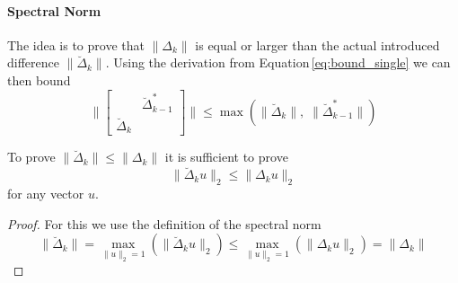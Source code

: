 \documentclass[numbers=noenddot,doctype=mastersthesis,BCOR=15mm,biblatex]{ldvbook}%
\begin{document}
\paragraph{Spectral Norm}
The idea is to prove that $\|\Delta_k\|$ is equal or larger than the actual introduced difference $\|\breve{\Delta}_k\|$.
Using the derivation from Equation\,\ref{eq:bound_single} we can then bound 
\begin{equation}
\Bigg\|
\begin{bmatrix}
& \breve{\Delta}_{k-1}^*\\
\breve{\Delta}_k
\end{bmatrix}
\Bigg\| \leq \max\left(\|\breve{\Delta}_k\|,\;\|\breve{\Delta}_{k-1}^*\|\right)
\end{equation}

To prove $\|\breve{\Delta}_k\| \leq \|\Delta_k\|$ it is sufficient to prove
\begin{equation}\label{eq:A_breve_leq_delta}
	\|\breve{\Delta}_k u\|_2 \leq \|\Delta_k u\|_2 
\end{equation}
for any vector $u$.
\begin{proof}
	For this we use the definition of the spectral norm
	\begin{equation}
		\|\breve{\Delta}_k\| =
		\underset{\|u\|_2 = 1}{\max}(\|\breve{\Delta}_k u\|_2)
		\leq 
		\underset{\|u\|_2 = 1}{\max}(\|\Delta_k u\|_2)
		=\|\Delta_k\|
	\end{equation}
\end{proof}
\end{document}
